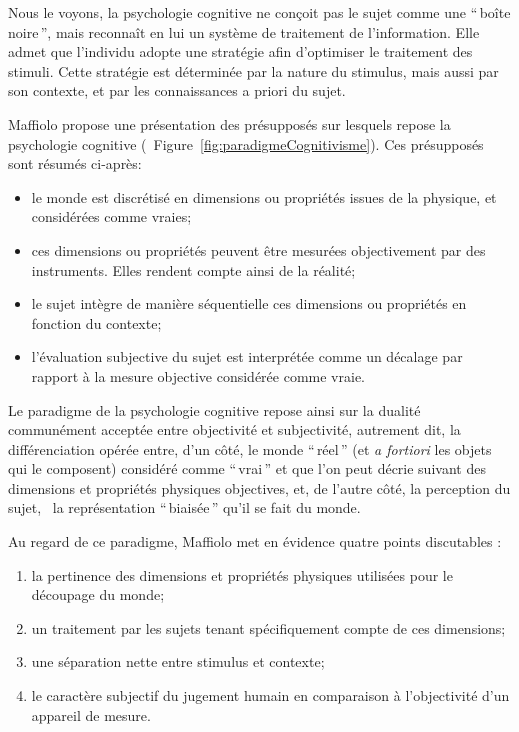 {Nous le voyons, la psychologie cognitive ne conçoit pas le sujet comme une ``\,boîte noire\,'', mais reconnaît en lui un système de traitement de l'information. Elle admet que l'individu adopte une stratégie afin d'optimiser le traitement des stimuli. Cette stratégie est déterminée par la nature du stimulus, mais aussi par son contexte, et par les connaissances a priori du sujet.

Maffiolo \citep{maffiolo_caracterisation_1999} propose une présentation des présupposés sur lesquels repose la psychologie cognitive (\cf~Figure~\ref{fig:paradigmeCognitivisme}). Ces présupposés sont résumés ci-après:

\begin{itemize}
\item le monde est discrétisé en dimensions ou propriétés issues de la physique, et considérées comme vraies;
\item ces dimensions ou propriétés peuvent être mesurées objectivement par des instruments. Elles rendent compte ainsi de la réalité;
\item le sujet intègre de manière séquentielle ces dimensions ou propriétés en fonction du contexte;
\item l'évaluation subjective du sujet est interprétée comme un décalage par rapport à la mesure objective considérée comme vraie.
\end{itemize}

Le paradigme de la psychologie cognitive repose ainsi sur la dualité communément acceptée entre objectivité et subjectivité, autrement dit, la différenciation opérée entre, d'un côté, le monde ``\,réel\,'' (et \emph{a fortiori} les objets qui le composent) considéré comme ``\,vrai\,'' et que l'on peut décrie suivant des dimensions et propriétés physiques objectives, et, de l'autre côté, la perception du sujet, \ie~la représentation ``\,biaisée\,'' qu'il se fait du monde.

Au regard de ce paradigme, Maffiolo met en évidence quatre points discutables :

\begin{enumerate}
\item la pertinence des dimensions et propriétés physiques utilisées pour le découpage du monde; 
\item un traitement par les sujets tenant spécifiquement compte de ces dimensions;
\item une séparation nette entre stimulus et contexte;
\item le caractère subjectif du jugement humain en comparaison à l'objectivité d'un appareil de mesure.
\end{enumerate}

}
